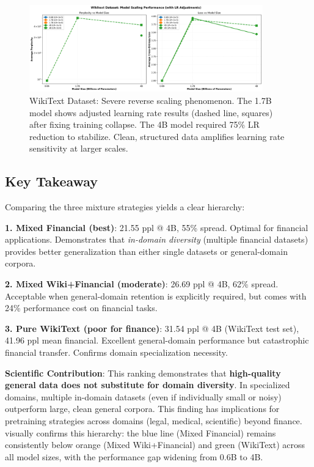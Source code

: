 \begin{figure}[h]
\centering
\includegraphics[width=0.9\textwidth]{figures/scaling_wikitext.png}
\caption[WikiText Dataset: Reverse Scaling]{WikiText Dataset: Severe reverse scaling phenomenon. The 1.7B model shows adjusted learning rate results (dashed line, squares) after fixing training collapse. The 4B model required 75\% LR reduction to stabilize. Clean, structured data amplifies learning rate sensitivity at larger scales.}
\label{fig:scaling_wikitext}
\end{figure}



\subsection{Key Takeaway}

Comparing the three mixture strategies yields a clear hierarchy:

\textbf{1. Mixed Financial (best)}: 21.55 ppl @ 4B, 55\% spread. Optimal for financial applications. Demonstrates that \textit{in-domain diversity} (multiple financial datasets) provides better generalization than either single datasets or general-domain corpora.

\textbf{2. Mixed Wiki+Financial (moderate)}: 26.69 ppl @ 4B, 62\% spread. Acceptable when general-domain retention is explicitly required, but comes with 24\% performance cost on financial tasks.

\textbf{3. Pure WikiText (poor for finance)}: 31.54 ppl @ 4B (WikiText test set), 41.96 ppl mean financial. Excellent general-domain performance but catastrophic financial transfer. Confirms domain specialization necessity.

\textbf{Scientific Contribution}: This ranking demonstrates that \textbf{high-quality general data does not substitute for domain diversity}. In specialized domains, multiple in-domain datasets (even if individually small or noisy) outperform large, clean general corpora. This finding has implications for pretraining strategies across domains (legal, medical, scientific) beyond finance.  visually confirms this hierarchy: the blue line (Mixed Financial) remains consistently below orange (Mixed Wiki+Financial) and green (WikiText) across all model sizes, with the performance gap widening from 0.6B to 4B.

